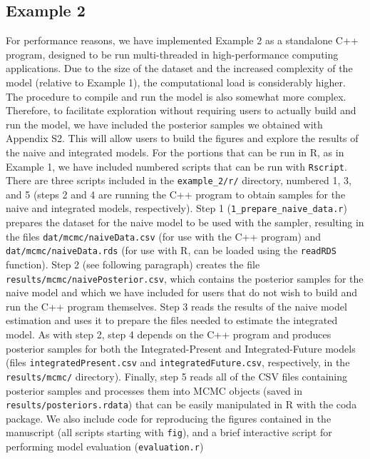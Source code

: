 \documentclass[11pt]{article}
\newcommand{\rev}[1]{{\color{RoyalBlue}#1}}
\begin{document}
\subsection*{Example 2}
\rev{
For performance reasons, we have implemented Example 2 as a standalone C++ program, designed to be run multi-threaded in high-performance computing applications.
Due to the size of the dataset and the increased complexity of the model (relative to Example 1), the computational load is considerably higher.
The procedure to compile and run the model is also somewhat more complex.
Therefore, to facilitate exploration without requiring users to actually build and run the model, we have included the posterior samples we obtained with Appendix S2.
This will allow users to build the figures and explore the results of the naive and integrated models.
For the portions that can be run in R, as in Example 1, we have included numbered scripts that can be run with {\tt Rscript}.
There are three scripts included in the {\tt example\_2/r/} directory, numbered 1, 3, and 5 (steps 2 and 4 are running the C++ program to obtain samples for the naive and integrated models, respectively).
Step 1 ({\tt 1\_prepare\_naive\_data.r}) prepares the dataset for the naive model to be used with the sampler, resulting in the files {\tt dat/mcmc/naiveData.csv} (for use with the C++ program) and {\tt dat/mcmc/naiveData.rds} (for use with R, can be loaded using the {\tt readRDS} function).
Step 2 (see following paragraph) creates the file {\tt results/mcmc/naivePosterior.csv}, which contains the posterior samples for the naive model and which we have included for users that do not wish to build and run the C++ program themselves.
Step 3 reads the results of the naive model estimation and uses it to prepare the files needed to estimate the integrated model.
As with step 2, step 4 depends on the C++ program and produces posterior samples for both the Integrated-Present and Integrated-Future models (files {\tt integratedPresent.csv} and {\tt integratedFuture.csv}, respectively, in the {\tt results/mcmc/} directory).
Finally, step 5 reads all of the CSV files containing posterior samples and processes them into MCMC objects (saved in {\tt results/posteriors.rdata}) that can be easily manipulated in R with the coda package.
We also include code for reproducing the figures contained in the manuscript (all scripts starting with {\tt fig}), and a brief interactive script for performing model evaluation ({\tt evaluation.r})

}
\end{document}
